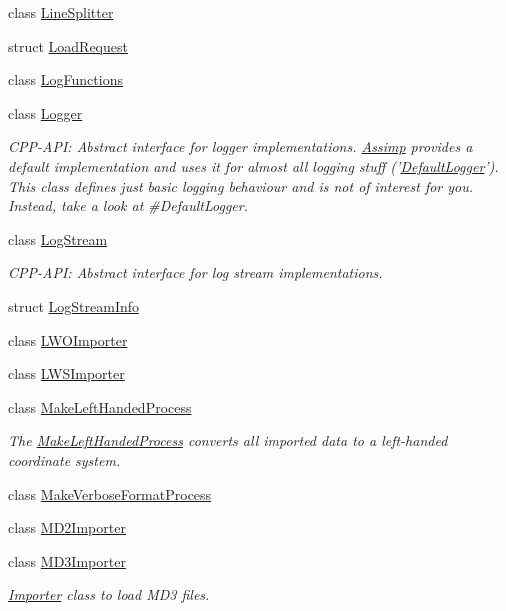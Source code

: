 \begin{DoxyCompactItemize}
class \hyperlink{class_assimp_1_1_line_splitter}{Line\+Splitter}
\item 
struct \hyperlink{struct_assimp_1_1_load_request}{Load\+Request}
\item 
class \hyperlink{class_assimp_1_1_log_functions}{Log\+Functions}
\item 
class \hyperlink{class_assimp_1_1_logger}{Logger}
\begin{DoxyCompactList}\small\item\em C\+P\+P-\/\+A\+P\+I\+: Abstract interface for logger implementations. \hyperlink{class_assimp}{Assimp} provides a default implementation and uses it for almost all logging stuff ('\hyperlink{class_assimp_1_1_default_logger}{Default\+Logger}'). This class defines just basic logging behaviour and is not of interest for you. Instead, take a look at \#\+Default\+Logger. \end{DoxyCompactList}\item 
class \hyperlink{class_assimp_1_1_log_stream}{Log\+Stream}
\begin{DoxyCompactList}\small\item\em C\+P\+P-\/\+A\+P\+I\+: Abstract interface for log stream implementations. \end{DoxyCompactList}\item 
struct \hyperlink{struct_assimp_1_1_log_stream_info}{Log\+Stream\+Info}
\item 
class \hyperlink{class_assimp_1_1_l_w_o_importer}{L\+W\+O\+Importer}
\item 
class \hyperlink{class_assimp_1_1_l_w_s_importer}{L\+W\+S\+Importer}
\item 
class \hyperlink{class_assimp_1_1_make_left_handed_process}{Make\+Left\+Handed\+Process}
\begin{DoxyCompactList}\small\item\em The \hyperlink{class_assimp_1_1_make_left_handed_process}{Make\+Left\+Handed\+Process} converts all imported data to a left-\/handed coordinate system. \end{DoxyCompactList}\item 
class \hyperlink{class_assimp_1_1_make_verbose_format_process}{Make\+Verbose\+Format\+Process}
\item 
class \hyperlink{class_assimp_1_1_m_d2_importer}{M\+D2\+Importer}
\item 
class \hyperlink{class_assimp_1_1_m_d3_importer}{M\+D3\+Importer}
\begin{DoxyCompactList}\small\item\em \hyperlink{class_assimp_1_1_importer}{Importer} class to load M\+D3 files. \end{DoxyCompactList}\item 

\end{DoxyCompactItemize}
